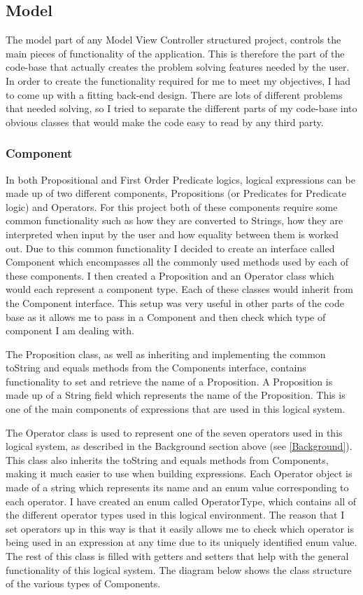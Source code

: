\subsection{Model}
The model part of any Model View Controller structured project, controls the main pieces of functionality of the application. This is therefore the part of the code-base that actually creates the problem solving features needed by the user. In order to create the functionality required for me to meet my objectives, I had to come up with a fitting back-end design. There are lots of different problems that needed solving, so I tried to separate the different parts of my code-base into obvious classes that would make the code easy to read by any third party.

\subsubsection{Component}
In both Propositional and First Order Predicate logics, logical expressions can be made up of two different components, Propositions (or Predicates for Predicate logic) and Operators. For this project both of these components require some common functionality such as how they are converted to Strings, how they are interpreted when input by the user and how equality between them is worked out. Due to this common functionality I decided to create an interface called Component which encompasses all the commonly used methods used by each of these components. I then created a Proposition and an Operator class which would each represent a component type. Each of these classes would inherit from the Component interface. This setup was very useful in other parts of the code base as it allows me to pass in a Component and then check which type of component I am dealing with.  

The Proposition class, as well as inheriting and implementing the common toString and equals methods from the Components interface, contains functionality to set and retrieve the name of a Proposition. A Proposition is made up of a String field which represents the name of the Proposition. This is one of the main components of expressions that are used in this logical system.

The Operator class is used to represent one of the seven operators used in this logical system, as described in the Background section above (see \ref{Background}). This class also inherits the toString and equals methods from Components, making it much easier to use when building expressions. Each Operator object is made of a string which represents its name and an enum value corresponding to each operator. I have created an enum called OperatorType, which contains all of the different operator types used in this logical environment. The reason that I set operators up in this way is that it easily allows me to check which operator is being used in an expression at any time due to its uniquely identified enum value. The rest of this class is filled with getters and setters that help with the general functionality of this logical system. The diagram below shows the class structure of the various types of Components.


